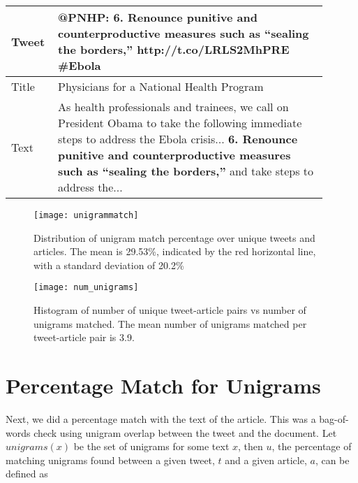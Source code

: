 \begin{table}[!htbp]
\centering
\begin{tabular}{|p{0.1\linewidth}|p{0.8\linewidth}|}
\hline
Tweet &  @PNHP: \textbf{6. Renounce punitive and counterproductive measures such as “sealing the borders,”} http://t.co/LRLS2MhPRE \#Ebola \\ \hline
Title & Physicians for a National Health Program \\  \hline
Text  & As health professionals and trainees, we call on President Obama to take the following immediate steps to address the Ebola crisis... \textbf{6. Renounce punitive and counterproductive measures such as “sealing the borders,”} and take steps to address the... \\ \hline
\end{tabular}
\label{tab:fullextract}
\end{table}


\begin{figure}[!htbp]
\centering
\texttt{[image: unigrammatch]}
\caption[Unigram matching percentages]{Distribution of unigram match percentage over unique tweets and articles. The mean is 29.53\%, indicated by the red horizontal line, with a standard deviation of 20.2\%}
\label{fig:unigrammatch}
\end{figure}


\begin{figure}[!htbp]
\centering
\texttt{[image: num\_unigrams]}
\caption[Histogram for number of unigrams matched]{Histogram of number of unique tweet-article pairs vs number of unigrams matched. The mean number of unigrams matched per tweet-article pair is 3.9.}
\label{fig:num_unigrams}
\end{figure}


\section{Percentage Match for Unigrams}
\label{sec:unigrams}

Next, we did a percentage match with the text of the article. This was a bag-of-words check using unigram overlap between the tweet and the document. Let $\textit{unigrams}(x)$ be the set of unigrams for some text $x$, then $u$, the percentage of matching unigrams found between a given tweet, $t$ and a given article, $a$, can be defined as  

